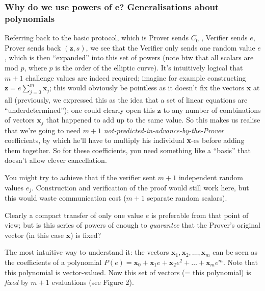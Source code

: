 \documentclass[10pt,a4paper]{article}
\begin{document}
\hypertarget{why-do-we-use-powers-of-e-generalisations-about-polynomials}{%
\subsubsection[Why do we use powers of e? Generalisations about
polynomials]{\texorpdfstring{\protect\hypertarget{anchor-31}{}{}Why do
we use powers of e? Generalisations about
polynomials}{Why do we use powers of e? Generalisations about polynomials}}\label{why-do-we-use-powers-of-e-generalisations-about-polynomials}}

Referring back to the basic protocol, which is Prover sends $C_0$ , Verifier
sends $e$, Prover sends back $(\mathbf{z}, s)$, we see that the Verifier only sends one
random value $e$, which is then ``expanded'' into this set of powers (note
btw that all scalars are mod $p$, where $p$ is the order of the elliptic
curve). It's intuitively logical that $m+1$ challenge values are indeed
required; imagine for example constructing $\mathbf{z} = e\sum_{j=0}^{m} \textbf{x}_j$; this would obviously be
pointless as it doesn't fix the vectors $\mathbf{x}$ at all (previously, we expressed
this as the idea that a set of linear equations are
``underdetermined''); one could clearly open this $\mathbf{z}$ to any
number of combinations of vectors $\mathbf{x}_j$ that happened to add up to
the same value. So this makes us realise that we're going to need
$m+1$ \emph{not-predicted-in-advance-by-the-Prover} coefficients, by which
he'll have to multiply his individual \textbf{x}-es before adding them
together. So for these coefficients, you need something like a ``basis''
that doesn't allow clever cancellation.

You might try to achieve that if the verifier sent $m+1$ independent random
values $e_j$. Construction and verification of the proof would still work
here, but this would waste communication cost ($m+1$ separate random
scalars).

Clearly a compact transfer of only one value $e$ is preferable from that
point of view; but is this series of powers of enough to
\emph{guarantee} that the Prover's original vector (in this case
$\mathbf{x}$) is fixed?

The most intuitive way to understand it: the vectors $\mathbf{x}_1, \mathbf{x}_2, \ldots, \mathbf{x}_m$ can be seen as the
coefficients of a polynomial $P(e) = \mathbf{x}_0 + \mathbf{x}_1e + \mathbf{x}_2e^2 + \ldots + \mathbf{x}_me^m$. Note that this polynomial is
vector-valued. Now this set of vectors (= this polynomial) is
\emph{fixed} by $m+1$ evaluations (see Figure 2).
\end{document}
